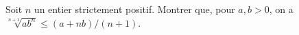 Soit $n$ un entier strictement positif. Montrer que, pour $a, b > 0$, on a $\sqrt[n+1]{ab^n} \leq (a + nb)/(n + 1)$.
